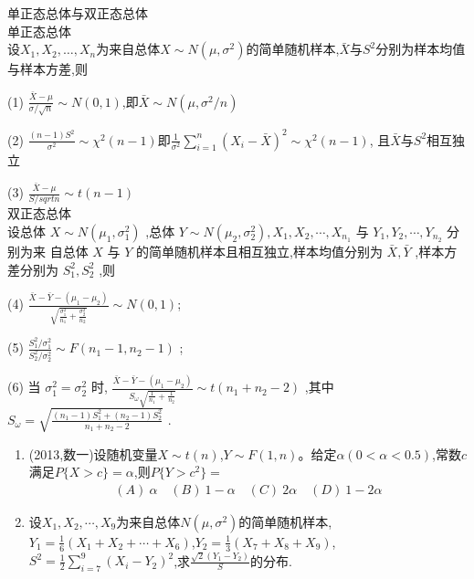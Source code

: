 \documentclass[12pt, a4paper, oneside, UTF8]{ctexbook}
\begin{document}
\begin{remark}
    单正态总体与双正态总体 \\
    单正态总体 \\
    设$X_1,X_2,\ldots,X_n$为来自总体$X\sim N(\mu,\sigma^2)$的简单随机样本,$\bar{X}$与$S^2$分别为样本均值与样本方差,则
    \item [(1)] $\frac{\bar{X}-\mu}{\sigma/\sqrt{n}}\sim N(0,1)$,即$\bar{X}\sim N(\mu,\sigma^2/n)$
    \item [(2)] $\frac{(n-1)S^2}{\sigma^2}\sim\chi^2(n-1)$即$\frac{1}{\sigma^2}\sum_{i=1}^{n}(X_i-\bar{X})^2\sim\chi^2(n-1)$,
    且$\bar{X}$与$S^2$相互独立 
    \item[(3)] $\frac{\bar{X}-\mu}{S/sqrt{n}}\sim t(n-1)$ \\
    双正态总体 \\
    设总体 $X \sim  N\left( {{\mu }_{1},{\sigma }_{1}^{2}}\right)$ ,总体 $Y \sim  N\left( {{\mu }_{2},{\sigma }_{2}^{2}}\right) ,{X}_{1},{X}_{2},\cdots ,{X}_{{n}_{1}}$ 与 ${Y}_{1},{Y}_{2},\cdots ,{Y}_{{n}_{2}}$ 分别为来
    自总体 $X$ 与 $Y$ 的简单随机样本且相互独立,样本均值分别为 $\bar{X},\bar{Y}$ ,样本方差分别为 ${S}_{1}^{2},{S}_{2}^{2}$ ,则
    \item[(4)] $\frac{\bar{X} - \bar{Y} - \left( {{\mu }_{1} - {\mu }_{2}}\right) }{\sqrt{\frac{{\sigma }_{1}^{2}}{{n}_{1}} + \frac{{\sigma }_{2}^{2}}{{n}_{2}}}} \sim  N\left( {0,1}\right)$;
    \item[(5)]$\frac{S_1^2/{\sigma }_{1}^{2}}{{S}_{2}^{2}/\sigma_2^2} \sim  F\left( {{n}_{1} - 1,{n}_{2} - 1}\right)$ ;
    \item[(6)]当 ${\sigma }_{1}^{2} = {\sigma }_{2}^{2}$ 时, $\frac{\bar{X} - \bar{Y} - \left( {{\mu }_{1} - {\mu }_{2}}\right) }{{S}_{\omega }\sqrt{\frac{1}{{n}_{1}} + \frac{1}{{n}_{2}}}} \sim  t\left( {{n}_{1} + {n}_{2} - 2}\right)$ ,其中 ${S}_{\omega } = \sqrt{\frac{\left( {{n}_{1} - 1}\right) {S}_{1}^{2} + \left( {{n}_{2} - 1}\right) {S}_{2}^{2}}{{n}_{1} + {n}_{2} - 2}}$ .
\end{remark}
\begin{enumerate}[label=\arabic*.]
    \item (2013,数一)设随机变量$X\sim t(n)$,$Y\sim F(1,n)$。给定$\alpha(0<\alpha<0.5)$,常数$c$满足$P\{X>c\}=\alpha$,则$P\{Y>c^2\}=$
    \begin{align*}
        (A)\ \alpha \quad (B)\ 1-\alpha \quad (C)\ 2\alpha \quad (D)\ 1-2\alpha
    \end{align*}
    
    \begin{solution}
    \newpage
    \end{solution}
    
    \item 设$X_1,X_2,\cdots,X_9$为来自总体$N(\mu,\sigma^2)$的简单随机样本,$Y_1=\frac{1}{6}(X_1+X_2+\cdots+X_6)$,$Y_2=\frac{1}{3}(X_7+X_8+X_9)$,$S^2=\frac{1}{2}\sum_{i=7}^9(X_i-Y_2)^2$,求$\frac{\sqrt{2}(Y_1-Y_2)}{S}$的分布.
    
    \begin{solution}
    \newpage
    \end{solution}
\end{enumerate}
\end{document}
